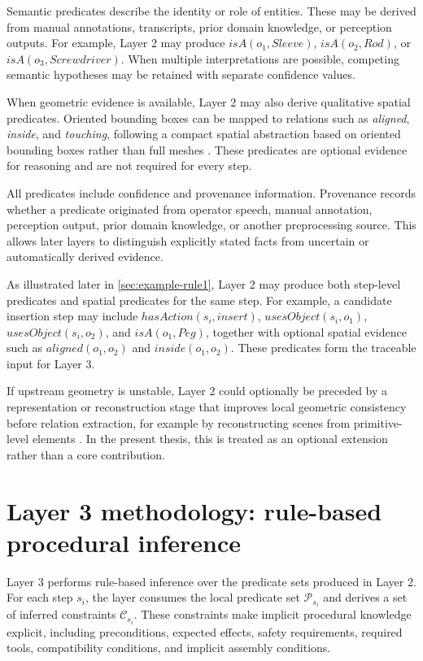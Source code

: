 Semantic predicates describe the identity or role of entities. These may be derived from manual annotations, transcripts, prior domain knowledge, or perception outputs. For example, Layer 2 may produce $isA(o_1,Sleeve)$, $isA(o_2,Rod)$, or $isA(o_3,Screwdriver)$. When multiple interpretations are possible, competing semantic hypotheses may be retained with separate confidence values.

When geometric evidence is available, Layer 2 may also derive qualitative spatial predicates. Oriented bounding boxes can be mapped to relations such as \textit{aligned}, \textit{inside}, and \textit{touching}, following a compact spatial abstraction based on oriented bounding boxes rather than full meshes \citep{Haesler_2025}. These predicates are optional evidence for reasoning and are not required for every step.

All predicates include confidence and provenance information. Provenance records whether a predicate originated from operator speech, manual annotation, perception output, prior domain knowledge, or another preprocessing source. This allows later layers to distinguish explicitly stated facts from uncertain or automatically derived evidence.

As illustrated later in \cref{sec:example-rule1}, Layer 2 may produce both step-level predicates and spatial predicates for the same step. For example, a candidate insertion step may include $hasAction(s_i,insert)$, $usesObject(s_i,o_1)$, $usesObject(s_i,o_2)$, and $isA(o_1,Peg)$, together with optional spatial evidence such as $aligned(o_1,o_2)$ and $inside(o_1,o_2)$. These predicates form the traceable input for Layer 3.

If upstream geometry is unstable, Layer 2 could optionally be preceded by a representation or reconstruction stage that improves local geometric consistency before relation extraction, for example by reconstructing scenes from primitive-level elements \citep{Mazur_2024}. In the present thesis, this is treated as an optional extension rather than a core contribution.


\section{Layer 3 methodology: rule-based procedural inference}
\label{sec:layer3-method}

Layer 3 performs rule-based inference over the predicate sets produced in Layer 2. For each step $s_i$, the layer consumes the local predicate set $\mathcal{P}_{s_i}$ and derives a set of inferred constraints $\mathcal{C}_{s_i}$. These constraints make implicit procedural knowledge explicit, including preconditions, expected effects, safety requirements, required tools, compatibility conditions, and implicit assembly conditions.


